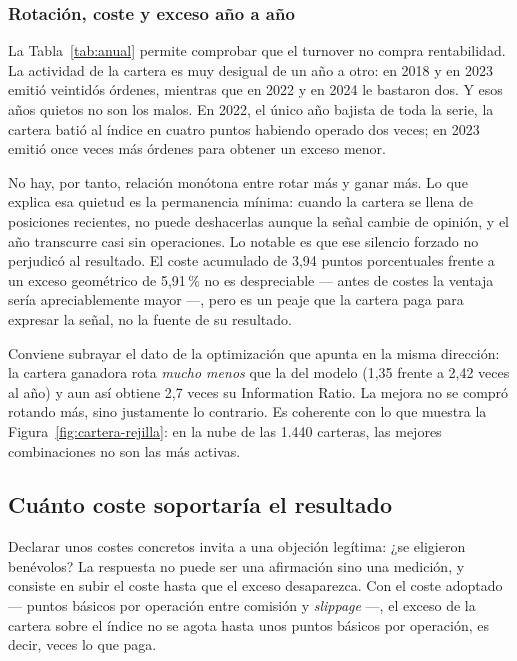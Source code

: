 \subsubsection*{Rotación, coste y exceso año a año}

La Tabla~\ref{tab:anual} permite comprobar que el turnover no compra rentabilidad. La actividad de la
cartera es muy desigual de un año a otro: en 2018 y en 2023 emitió veintidós órdenes, mientras que en
2022 y en 2024 le bastaron dos. Y esos años quietos no son los malos. En 2022, el único año bajista
de toda la serie, la cartera batió al índice en cuatro puntos habiendo operado dos veces; en 2023
emitió once veces más órdenes para obtener un exceso menor.

No hay, por tanto, relación monótona entre rotar más y ganar más. Lo que explica esa quietud es la
permanencia mínima: cuando la cartera se llena de posiciones recientes, no puede deshacerlas aunque
la señal cambie de opinión, y el año transcurre casi sin operaciones. Lo notable es que ese silencio
forzado no perjudicó al resultado. El coste acumulado de 3,94 puntos porcentuales frente a un exceso
geométrico de 5,91\,\% no es despreciable --- antes de costes la ventaja sería apreciablemente
mayor ---, pero es un peaje que la cartera paga para expresar la señal, no la fuente de su
resultado.

Conviene subrayar el dato de la optimización que apunta en la misma dirección: la cartera ganadora
rota \emph{mucho menos} que la del modelo (1,35 frente a 2,42 veces al año) y aun así obtiene 2,7
veces su Information Ratio. La mejora no se compró rotando más, sino justamente lo contrario. Es
coherente con lo que muestra la Figura~\ref{fig:cartera-rejilla}: en la nube de las 1.440 carteras,
las mejores combinaciones no son las más activas.

\subsection{Cuánto coste soportaría el resultado}
\label{sec:sensibilidad-costes}

Declarar unos costes concretos invita a una objeción legítima: ¿se eligieron benévolos? La respuesta
no puede ser una afirmación sino una medición, y consiste en subir el coste hasta que el exceso
desaparezca. Con el coste adoptado --- \CosteAdoptado{} puntos básicos por operación entre comisión y
\textit{slippage} ---, el exceso de la cartera sobre el índice no se agota hasta unos
\CosteEquilibrio{} puntos básicos por operación, es decir, \MargenCoste{} veces lo que
paga.

